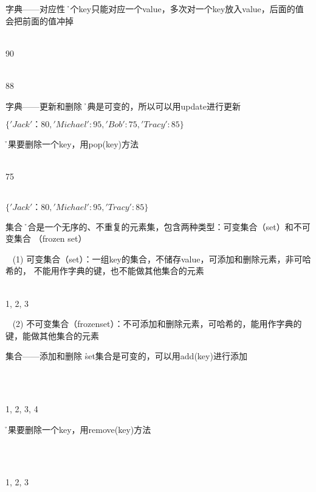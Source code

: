 \begin{frame}[fragile]{字典——对应性}
  \h 一个key只能对应一个value，多次对一个key放入value，后面的值会把前面的值冲掉


   \\ 
  90


   \\ 
  88

\end{frame}

\begin{frame}[fragile]{字典——更新和删除}
  \h 字典是可变的，所以可以用update进行更新 




  $\{'Jack'：80 ,'Michael': 95, 'Bob': 75, 'Tracy': 85\}$


  \h 如果要删除一个key，用pop(key)方法
  
   \\
  75

   \\
  $\{'Jack'：80 ,'Michael': 95, 'Tracy': 85\}$
\end{frame}

\begin{frame}[fragile]{集合}
    \h 集合是一个无序的、不重复的元素集，包含两种类型：可变集合（set）和不可变集合
    （frozen set）
    
    ~ (1) 可变集合（set）：一组key的集合，不储存value，可添加和删除元素，非可哈希的，
    不能用作字典的键，也不能做其他集合的元素

  
     \\  
    {1, 2, 3}
    
    ~ (2) 不可变集合（frozenset）：不可添加和删除元素，可哈希的，能用作字典的键，能做其他集合的元素
\end{frame}

\begin{frame}[fragile]{集合——添加和删除}
    \h set集合是可变的，可以用add(key)进行添加 

    ~  

    ~  \\ 
    {1, 2, 3, 4}

    \h 如果要删除一个key，用remove(key)方法 

    ~  

    ~  \\
    {1, 2, 3}
\end{frame}

